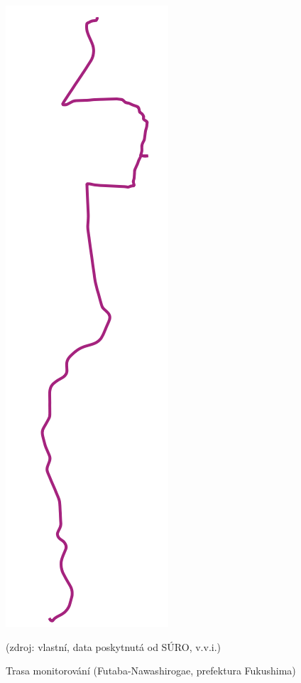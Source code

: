 \begin{figure}[H]
    \centering
    \includegraphics[scale=0.2]{./pictures/trasa_monitorovani.png}
      	\caption[Trasa monitorování (Futaba-Nawashirogae, prefektura Fukushima)]{Trasa monitorování (Futaba-Nawashirogae, prefektura Fukushima)}(zdroj: vlastní, data poskytnutá od SÚRO, v.v.i.)
    	\label{fig:interpolatedMap}
\end{figure}

